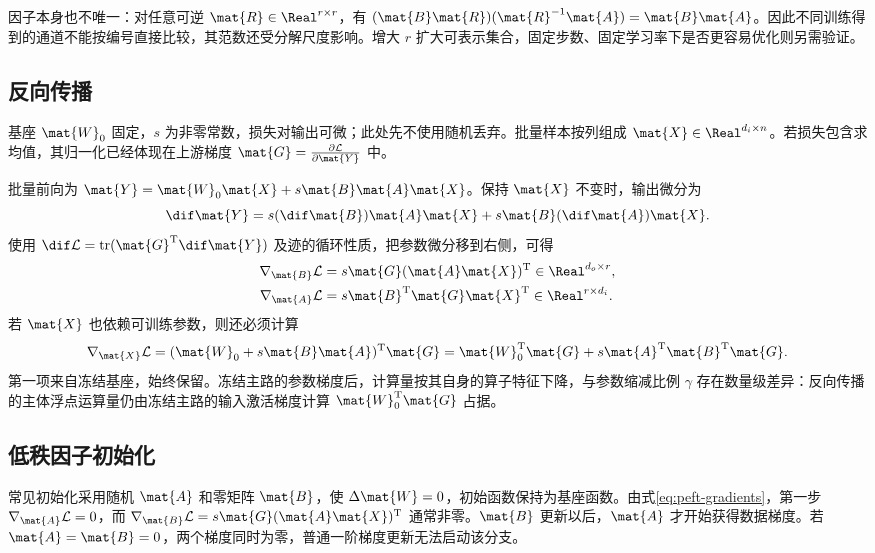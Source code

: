 \documentclass[../textbook.tex]{subfiles}
\begin{document}
因子本身也不唯一：对任意可逆 $\mat{R}\in\Real^{r\times r}$，有 $(\mat{B}\mat{R})(\mat{R}^{-1}\mat{A})=\mat{B}\mat{A}$。因此不同训练得到的通道不能按编号直接比较，其范数还受分解尺度影响。增大 $r$ 扩大可表示集合，固定步数、固定学习率下是否更容易优化则另需验证。

\subsection{反向传播}

\begin{assumption}
基座 $\mat{W}_0$ 固定，$s$ 为非零常数，损失对输出可微；此处先不使用随机丢弃。批量样本按列组成 $\mat{X}\in\Real^{d_i\times n}$。若损失包含求均值，其归一化已经体现在上游梯度 $\mat{G}=\frac{\partial\mathcal L}{\partial \mat{Y}}$ 中。
\end{assumption}

批量前向为 $\mat{Y}=\mat{W}_0\mat{X}+s\mat{B}\mat{A}\mat{X}$。保持 $\mat{X}$ 不变时，输出微分为
\begin{equation}
\dif \mat{Y}=s(\dif \mat{B})\mat{A}\mat{X}+s\mat{B}(\dif \mat{A})\mat{X}.
\end{equation}
使用 $\dif\mathcal L=\operatorname{tr}(\mat{G}^{\mathrm{T}}\dif \mat{Y})$ 及迹的循环性质，把参数微分移到右侧，可得
\begin{align}
\nabla_{\mat{B}}\mathcal L&=s\mat{G}(\mat{A}\mat{X})^{\mathrm{T}}\in\Real^{d_o\times r},\\
\nabla_{\mat{A}}\mathcal L&=s\mat{B}^{\mathrm{T}}\mat{G}\mat{X}^{\mathrm{T}}\in\Real^{r\times d_i}.
\label{eq:peft-gradients}
\end{align}
若 $\mat{X}$ 也依赖可训练参数，则还必须计算
\begin{equation}
\nabla_{\mat{X}}\mathcal L=(\mat{W}_0+s\mat{B}\mat{A})^{\mathrm{T}}\mat{G}
=\mat{W}_0^{\mathrm{T}}\mat{G}+s\mat{A}^{\mathrm{T}}\mat{B}^{\mathrm{T}}\mat{G}.
\label{eq:peft-inputgradient}
\end{equation}
第一项来自冻结基座，始终保留。冻结主路的参数梯度后，计算量按其自身的算子特征下降，与参数缩减比例 $\gamma$ 存在数量级差异：反向传播的主体浮点运算量仍由冻结主路的输入激活梯度计算 $\mat{W}_0^{\mathrm{T}}\mat{G}$ 占据。


\subsection{低秩因子初始化}
常见初始化采用随机 $\mat{A}$ 和零矩阵 $\mat{B}$，使 $\Delta \mat{W}=0$，初始函数保持为基座函数。由式\eqref{eq:peft-gradients}，第一步 $\nabla_{\mat{A}}\mathcal L=0$，而 $\nabla_{\mat{B}}\mathcal L=s\mat{G}(\mat{A}\mat{X})^{\mathrm{T}}$ 通常非零。$\mat{B}$ 更新以后，$\mat{A}$ 才开始获得数据梯度。若 $\mat{A}=\mat{B}=0$，两个梯度同时为零，普通一阶梯度更新无法启动该分支。
\end{document}
